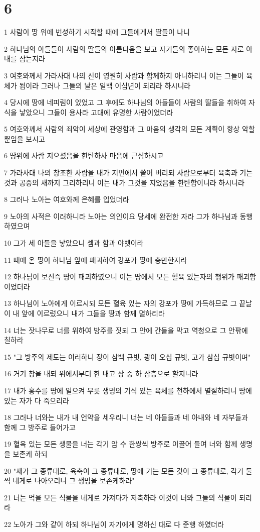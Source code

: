 \chapter{6}

\par 1 사람이 땅 위에 번성하기 시작할 때에 그들에게서 딸들이 나니
\par 2 하나님의 아들들이 사람의 딸들의 아름다움을 보고 자기들의 좋아하는 모든 자로 아내를 삼는지라
\par 3 여호와께서 가라사대 나의 신이 영원히 사람과 함께하지 아니하리니 이는 그들이 육체가 됨이라 그러나 그들의 날은 일백 이십년이 되리라 하시니라
\par 4 당시에 땅에 네피림이 있었고 그 후에도 하나님의 아들들이 사람의 딸들을 취하여 자식을 낳았으니 그들이 용사라 고대에 유명한 사람이었더라
\par 5 여호와께서 사람의 죄악이 세상에 관영함과 그 마음의 생각의 모든 계획이 항상 악할 뿐임을 보시고
\par 6 땅위에 사람 지으셨음을 한탄하사 마음에 근심하시고
\par 7 가라사대 나의 창조한 사람을 내가 지면에서 쓸어 버리되 사람으로부터 육축과 기는 것과 공중의 새까지 그리하리니 이는 내가 그것을 지었음을 한탄함이니라 하시니라
\par 8 그러나 노아는 여호와께 은혜를 입었더라
\par 9 노아의 사적은 이러하니라 노아는 의인이요 당세에 완전한 자라 그가 하나님과 동행 하였으며
\par 10 그가 세 아들을 낳았으니 셈과 함과 야벳이라
\par 11 때에 온 땅이 하나님 앞에 패괴하여 강포가 땅에 충만한지라
\par 12 하나님이 보신즉 땅이 패괴하였으니 이는 땅에서 모든 혈육 있는자의 행위가 패괴함이었더라
\par 13 하나님이 노아에게 이르시되 모든 혈육 있는 자의 강포가 땅에 가득하므로 그 끝날이 내 앞에 이르렀으니 내가 그들을 땅과 함께 멸하리라
\par 14 너는 잣나무로 너를 위하여 방주를 짓되 그 안에 간들을 막고 역청으로 그 안팎에 칠하라
\par 15 "그 방주의 제도는 이러하니 장이 삼백 규빗, 광이 오십 규빗, 고가 삼십 규빗이며"
\par 16 거기 창을 내되 위에서부터 한 내고 상 중 하 삼층으로 할지니라
\par 17 내가 홍수를 땅에 일으켜 무릇 생명의 기식 있는 육체를 천하에서 멸절하리니 땅에 있는 자가 다 죽으리라
\par 18 그러나 너와는 내가 내 언약을 세우리니 너는 네 아들들과 네 아내와 네 자부들과 함께 그 방주로 들어가고
\par 19 혈육 있는 모든 생물을 너는 각기 암 수 한쌍씩 방주로 이끌어 들여 너와 함께 생명을 보존케 하되
\par 20 "새가 그 종류대로, 육축이 그 종류대로, 땅에 기는 모든 것이 그 종류대로, 각기 둘씩 네게로 나아오리니 그 생명을 보존케하라"
\par 21 너는 먹을 모든 식물을 네게로 가져다가 저축하라 이것이 너와 그들의 식물이 되리라
\par 22 노아가 그와 같이 하되 하나님이 자기에게 명하신 대로 다 준행 하였더라

